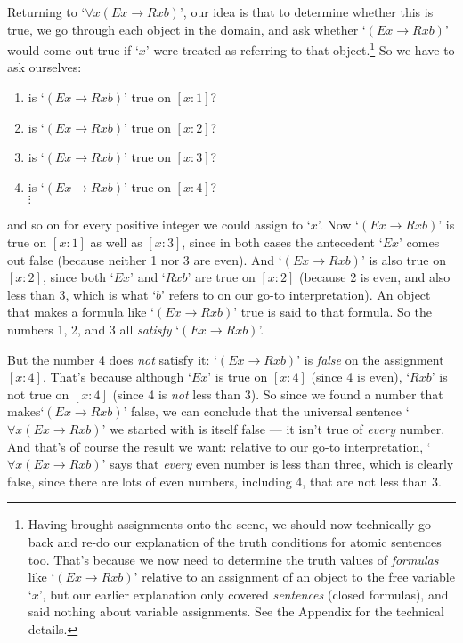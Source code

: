 Returning to `$\forall x(Ex \rightarrow Rxb)$', our idea is that to determine whether this is true, we go through each object in the domain, and ask whether `$(Ex \rightarrow Rxb)$' would come out true if `$x$' were treated as referring to that object.\footnote{Having brought assignments onto the scene, we should now technically go back and re-do our explanation of the truth conditions for atomic sentences too.  That's because we now need to determine the truth values of \emph{formulas} like `$(Ex \rightarrow Rxb)$' relative to an assignment of an object to the free variable `$x$', but our earlier explanation only covered \emph{sentences} (closed formulas), and said nothing about variable assignments.  See the Appendix for the technical details.}
So we have to ask ourselves:
\begin{enumerate}
\item[] is `$(Ex \rightarrow Rxb)$' true on $[x:1]$?
\item[] is `$(Ex \rightarrow Rxb)$' true on $[x:2]$?
\item[] is `$(Ex \rightarrow Rxb)$' true on $[x:3]$?
\item[] is `$(Ex \rightarrow Rxb)$' true on $[x:4]$?\\
$\vdots$
\end{enumerate}
and so on for every positive integer we could assign to `$x$'.  Now `$(Ex \rightarrow Rxb)$' is true on $[x:1]$ as well as $[x:3]$, since in both cases the antecedent `$Ex$' comes out false (because neither 1 nor 3 are even). And `$(Ex \rightarrow Rxb)$' is also true on $[x:2]$, since both `$Ex$' and `$Rxb$' are true on $[x:2]$ (because 2 is even, and also less than 3, which is what `$b$' refers to on our go-to interpretation).  An object that makes a formula like `$(Ex \rightarrow Rxb)$' true is said to  that formula.  So the numbers 1, 2, and 3 all \emph{satisfy} `$(Ex \rightarrow Rxb)$'.

But the number 4 does \emph{not} satisfy it: `$(Ex \rightarrow Rxb)$' is \emph{false} on the assignment $[x:4]$.  That's because although `$Ex$' is true on $[x:4]$ (since 4 is even), `$Rxb$' is not true on $[x:4]$ (since 4 is \emph{not} less than 3).  So  since we found a number that makes`$(Ex \rightarrow Rxb)$' false, we can conclude that the universal sentence `$\forall x(Ex \rightarrow Rxb)$' we started with is itself false --- it isn't true of \emph{every} number.  And that's of course the result we want: relative to our go-to interpretation, `$\forall x(Ex \rightarrow Rxb)$' says that \emph{every} even number is less than three, which is clearly false, since there are lots of even numbers, including 4, that are not less than 3.

